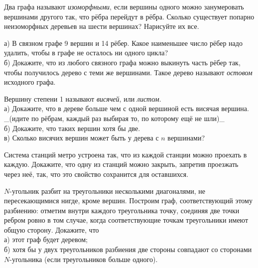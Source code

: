 \problem Два графа называют \textit{изоморфными}, если вершины одного можно занумеровать вершинами другого так, что рёбра перейдут в рёбра. Сколько существует попарно неизоморфных деревьев на шести вершинах? Нарисуйте их все.

\problem а) В связном графе 9 вершин и 14 рёбер. Какое наименьшее число рёбер надо удалить, чтобы в графе не осталось ни одного цикла?\\
б) Докажите, что из любого связного графа можно выкинуть часть рёбер так, чтобы получилось дерево с теми же вершинами. Такое дерево называют \textit{остовом} исходного графа.

\problem Вершину степени 1 называют \textit{висячей}, или \textit{листом}.\\
а) Докажите, что в дереве больше чем с одной вершиной есть висячая вершина. _(идите по рёбрам, каждый раз выбирая то, по которому ещё не шли)_\\
б) Докажите, что таких вершин хотя бы две.\\
в) Сколько висячих вершин может быть у дерева с $n$ вершинами?

\problem Система станций метро устроена так, что из каждой станции можно проехать в каждую. Докажите, что одну из станций можно закрыть, запретив проезжать через неё, так, что это свойство сохранится для оставшихся.

\problem $N$-угольник разбит на треугольники несколькими диагоналями, не пересекающимися нигде, кроме вершин. Построим граф, соответствующий этому разбиению: отметим внутри каждого треугольника точку, соединяя две точки ребром ровно в том случае, когда соответствующие точкам треугольники имеют общую сторону. Докажите, что\\
а) этот граф будет деревом;\\
б) хотя бы у двух треугольников разбиения две стороны совпадают со сторонами $N$-угольника (если треугольников больше одного).
